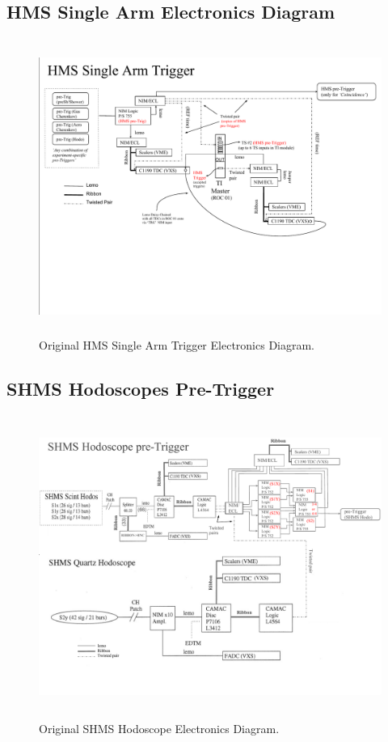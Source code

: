 \documentclass[11pt]{article}
\begin{document}
\begin{appendices}
\subsection{HMS Single Arm Electronics Diagram}
\label{appendix:Appx5}
\begin{figure}[h!]
  \centering
  \includegraphics[width=7.0in, height=3.8in]{images/HMS_SingleArm_Trigger.pdf}
  \caption{Original HMS Single Arm Trigger Electronics Diagram.}
  \label{fig:hms_one_arm_trg}
\end{figure}
\subsection{SHMS Hodoscopes Pre-Trigger}
\label{appendix:Appx6}
\begin{figure}[h!]
  \centering
  \includegraphics[width=6.8in, height=3.9in]{images/SHMS_HODO_TRIGGER.pdf}
  \caption{Original SHMS Hodoscope Electronics Diagram.}
  \label{fig:shms_hod_trg}
\end{figure}
\newpage

\end{appendices}
\end{document}
